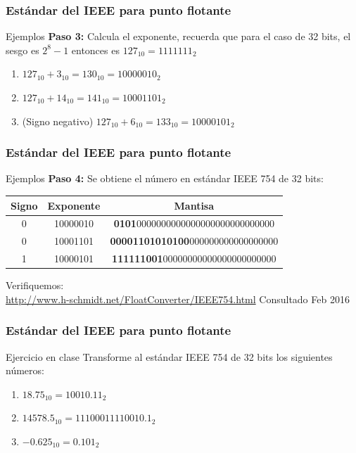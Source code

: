 \documentclass{beamer}
\begin{document}
\begin{frame}
	\frametitle{Estándar del IEEE para punto flotante}
	\begin{block}{Ejemplos}
	\textbf{Paso 3:} Calcula el exponente, recuerda que para el caso de 32 bits, el sesgo es $2^8 - 1$ entonces es $127_{10}=1111111_{2}$
	\begin{enumerate}
		\item $127_{10}+3_{10} = 130_{10} = 10000010_{2}$
		\item $127_{10}+14_{10} = 141_{10} = 10001101_{2}$
		\item (Signo negativo) $127_{10}+6_{10} = 133_{10} = 10000101_{2}$
	\end{enumerate}	
	\end{block}
\end{frame}

\begin{frame}
	\frametitle{Estándar del IEEE para punto flotante}
	\begin{block}{Ejemplos}
	\textbf{Paso 4:} Se obtiene el número en estándar IEEE 754 de 32 bits:
		\begin{table}[H]
		\begin{tabular}{|c|c|c|}
		\hline 
		\textbf{Signo} & \textbf{Exponente }& \textbf{Mantisa} \\ 
		\hline 
		0 & 10000010 & \textbf{0101}0000000000000000000000000000 \\ 
		\hline 
		0 & 10001101 & \textbf{00001101010100}000000000000000000 \\ 
		\hline 
		1 & 10000101 & \textbf{111111001}00000000000000000000000 \\ 
		\hline 
		\end{tabular}
		\end{table} 
	\end{block}
	Verifiquemos:\\ \url{http://www.h-schmidt.net/FloatConverter/IEEE754.html} Consultado Feb 2016
\end{frame}

\begin{frame}
	\frametitle{Estándar del IEEE para punto flotante}
	\begin{block}{Ejercicio en clase}
	Transforme al estándar IEEE 754 de 32 bits los siguientes números:
	\begin{enumerate}
		\item $18.75_{10} = 10010.11_{2}$
		\item $14578.5_{10} = 11100011110010.1_{2} $
		\item $-0.625_{10} = 0.101_{2}$
	\end{enumerate}	
	\end{block}
\end{frame}
\end{document}
